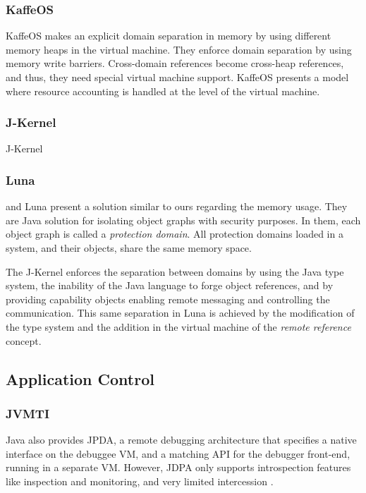 \subsubsection*{KaffeOS}
KaffeOS \cite{Back00a} makes an explicit domain separation in memory by using different memory heaps in the virtual machine. They enforce domain separation by using memory write barriers. Cross-domain references become cross-heap references, and thus, they need special virtual machine support.
KaffeOS presents a model where resource accounting is handled at the level of the virtual machine.

\subsubsection*{J-Kernel}
J-Kernel \cite{Hawb98a}

\subsubsection*{Luna}
 and Luna \cite{Hawb02a} present a solution similar to ours regarding the memory usage. They are Java solution for isolating object graphs with security purposes. In them, each object graph is called a \emph{protection domain}. All protection domains loaded in a system, and their objects, share the same memory space. 

The J-Kernel enforces the separation between domains by using the Java type system, the inability of the Java language to forge object references, and by providing capability objects\cite{Levy84a,Mill03a,Spoo00a} enabling remote messaging and controlling the communication. This same separation in Luna \cite{Hawb02a} is achieved by the modification of the type system and the addition in the virtual machine of the \emph{remote reference} concept.

\subsection{Application Control}

\subsubsection*{JVMTI}
Java also provides JPDA, a remote debugging architecture that specifies a native interface on the debuggee VM, and a matching API for the debugger front-end, running in a separate VM. However, JDPA only supports introspection features like  inspection and monitoring, and very limited intercession \cite{jdpa}.

